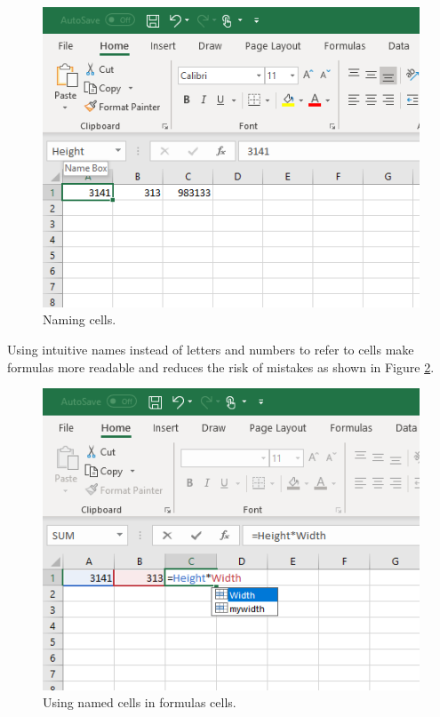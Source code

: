 \documentclass[]{book}
\begin{document}
\begin{figure}

{\centering \includegraphics[width=0.8\linewidth]{_resources/chapter_advexc/1} 

}

\caption{Naming cells.}\label{fig:advex9}
\end{figure}

Using intuitive names instead of letters and numbers to refer to cells make formulas more readable and reduces the risk of mistakes as shown in Figure \ref{fig:advex10}.

\begin{figure}

{\centering \includegraphics[width=0.8\linewidth]{_resources/chapter_advexc/2} 

}

\caption{Using named cells in formulas cells.}\label{fig:advex10}
\end{figure}
\end{document}
